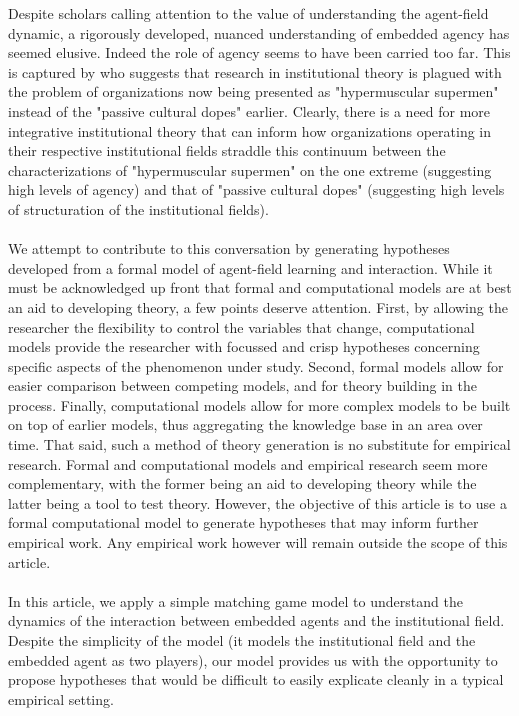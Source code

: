 \documentclass[12pt]{article}
\begin{document}
\noindent Despite scholars calling attention to the value of understanding the agent-field dynamic, a rigorously developed, nuanced understanding of embedded agency has seemed elusive. Indeed the role of agency seems to have been carried too far. This is captured by \cite{Suddaby2010} who suggests that research in institutional theory is plagued with the problem of organizations now being presented as "hypermuscular supermen" instead of the "passive cultural dopes" earlier. Clearly, there is a need for more integrative institutional theory that can inform how organizations operating in their respective institutional fields straddle this continuum between the characterizations of "hypermuscular supermen" on the one extreme (suggesting high levels of agency) and that of "passive cultural dopes" (suggesting high levels of structuration of the institutional fields).\\\\

\noindent We attempt to contribute to this conversation by generating hypotheses developed from a formal model of agent-field learning and interaction. While it must be acknowledged up front that formal and computational models are at best an aid to developing theory, a few points deserve attention. First, by allowing the researcher the flexibility to control the variables that change, computational models provide the researcher with focussed and crisp hypotheses concerning specific aspects of the phenomenon under study. Second, formal models allow for easier comparison between competing models, and for theory building in the process. Finally, computational models allow for more complex models to be built on top of earlier models, thus aggregating the knowledge base in an area over time. That said, such a method of theory generation is no substitute for empirical research. Formal and computational models and empirical research seem more complementary, with the former being an aid to developing theory while the latter being a tool to test theory. However, the objective of this article is to use a formal computational model to generate hypotheses that may inform further empirical work. Any empirical work however will remain outside the scope of this article.\\\\

\noindent In this article, we apply a simple matching game model to  understand the dynamics of the interaction between embedded agents and the institutional field. Despite the simplicity of the model (it models the institutional field and the embedded agent as two players), our model provides us with the opportunity to propose hypotheses that would be difficult to easily explicate cleanly in a typical empirical setting.\\\\
\end{document}
